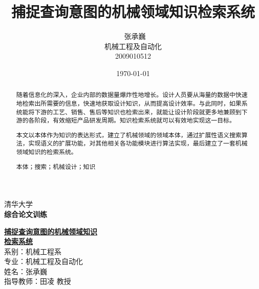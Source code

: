 \documentclass[12pt,a4paper]{article}
\title{\yihao\textbf{捕捉查询意图的机械领域知识检索系统}}
\author{\xiaosihao\ 张承巍\\机械工程及自动化\\2009010512}
\date{\today}
\newcommand{\xiaochu}{\fontsize{36pt}{\baselineskip}\selectfont}
\newcommand{\yihao}{\fontsize{26pt}{\baselineskip}\selectfont}
\newcommand{\sanhao}{\fontsize{16pt}{\baselineskip}\selectfont}
\newcommand{\xiaosanhao}{\fontsize{15pt}{\baselineskip}\selectfont}
\renewcommand{\today}{\number\year 年\number\month 月\number\day 日}
\begin{document}
\begin{titlepage}
\begin{center}



{\yihao \lishu 清华大学}\\[1.5cm]

\textbf{\xiaochu \bfseries {综合论文训练} }\\[1.5cm]

\end{center}
\textbf{\xiaosanhao{题目：}\yihao \underline{捕捉查询意图的机械领域知识}\\ \hspace*{14mm} \underline{检索系统}}\\[4cm]




{
\FangSong \sanhao 
\hspace{11mm}系\hspace{11mm}别：机械工程系\\[0.25cm]

\hspace{11mm}专\hspace{11mm}业：机械工程及自动化\\[0.25cm]

\hspace{11mm}姓\hspace{11mm}名：张承巍\\[0.25cm]

\hspace{11mm}指导教师：田凌 教授\\[3cm]

}



\center{ \large \today}





\end{titlepage}



\renewcommand\abstractname{\xiaosanhao 中文摘要}


\begin{abstract}

\setlength{\baselineskip}{20pt} %
\noindent
\quad \quad 随着信息化的深入，企业内部的数据量爆炸性地增长。设计人员要从海量的数据中快速地检索出所需要的信息，快速地获取设计知识，从而提高设计效率。与此同时，如果系统能将下游的工艺、销售、售后等知识也检索出来，就能让设计阶段就更多地兼顾到下游的各阶段，有效缩短产品研发周期。知识检索系统就可以有效地实现这一目标。

\noindent
\quad \quad 本文以本体作为知识的表达形式，建立了机械领域的领域本体，通过扩展性语义搜索算法，实现语义的扩展功能，对其他相关各功能模块进行算法实现，最后建立了一套机械领域知识的检索系统。

\noindent
\quad \quad 
  \SimSun
 本体；搜索；机械设计；知识
\end{abstract}
\end{document}
